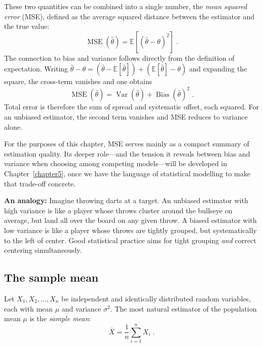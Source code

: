 \medskip

These two quantities can be combined into a single number, the \textit{mean squared error} (MSE), defined as the average squared distance between the estimator and the true value:
\begin{equation}
    \operatorname{MSE}(\hat{\theta}) = \mathbb{E}\!\left[(\hat{\theta} - \theta)^2\right] \; .
\end{equation}
The connection to bias and variance follows directly from the definition of expectation. Writing $\hat{\theta} - \theta = (\hat{\theta} - \mathbb{E}[\hat{\theta}]) + (\mathbb{E}[\hat{\theta}] - \theta)$ and expanding the square, the cross-term vanishes and one obtains
\begin{equation}
    \operatorname{MSE}(\hat{\theta}) = \operatorname{Var}(\hat{\theta}) + \operatorname{Bias}(\hat{\theta})^2 \; .
\end{equation}
Total error is therefore the sum of spread and systematic offset, each squared. For an unbiased estimator, the second term vanishes and MSE reduces to variance alone.

\medskip

For the purposes of this chapter, MSE serves mainly as a compact summary of estimation quality. Its deeper role---and the tension it reveals between bias and variance when choosing among competing models---will be developed in Chapter~\ref{chapter5}, once we have the language of statistical modelling to make that trade-off concrete.

\medskip

\textbf{An analogy:} Imagine throwing darts at a target. An unbiased estimator with high variance is like a player whose throws cluster around the bullseye on average, but land all over the board on any given throw. A biased estimator with low variance is like a player whose throws are tightly grouped, but systematically to the left of center. Good statistical practice aims for tight grouping \textit{and} correct centering simultaneously.

\subsection*{The sample mean}
 
Let $X_1, X_2, \dots, X_n$ be independent and identically distributed random variables, each with mean $\mu$ and variance $\sigma^2$. The most natural estimator of the population mean $\mu$ is the \textit{sample mean}:
\begin{equation}
    \bar{X} = \frac{1}{n} \sum_{i=1}^{n} X_i \; .
\end{equation}

